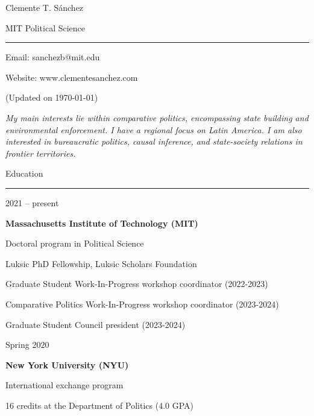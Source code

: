 \documentclass[a4paper, 12pt]{article}
\begin{document}
\Huge{Clemente T. Sánchez}

\medskip

\large{MIT Political Science}

\smallskip

\rule{\textwidth}{2pt}

\medskip

\normalsize

Email: sanchezb@mit.edu

Website: www.clementesanchez.com

\bigskip




(Updated on \today)

\medskip

\small\textit{My main interests lie within comparative politics, encompassing state building and environmental enforcement. I have a regional focus on Latin America. I am also interested in bureaucratic politics, causal inference, and state-society relations in frontier territories.}

\bigskip




\large Education
\smallskip
\hrule
\normalsize


\begin{multicols}{2}

2021 -- present
\columnbreak

\textbf{Massachusetts Institute of Technology (MIT)}
\medskip

Doctoral program in Political Science

Luksic PhD Fellowship, Luksic Scholars Foundation

Graduate Student Work-In-Progress workshop coordinator (2022-2023)

Comparative Politics Work-In-Progress workshop coordinator (2023-2024)

Graduate Student Council president (2023-2024)

\end{multicols}


\begin{multicols}{2}

Spring 2020
\columnbreak

\textbf{New York University (NYU)}
\medskip

International exchange program

16 credits at the Department of Politics (4.0 GPA)

\end{multicols}
\end{document}
